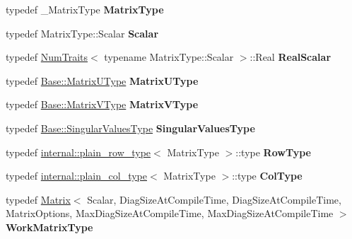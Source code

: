 \begin{DoxyCompactItemize}
typedef \+\_\+\+Matrix\+Type {\bfseries Matrix\+Type}
\item 
\mbox{\label{group___s_v_d___module_af8aa379704163fb6ea722beb615f0862}} 
typedef Matrix\+Type\+::\+Scalar {\bfseries Scalar}
\item 
\mbox{\label{group___s_v_d___module_a33c5cda5ab6ba0d06c567a05deff89e4}} 
typedef \hyperlink{group___core___module_struct_eigen_1_1_num_traits}{Num\+Traits}$<$ typename Matrix\+Type\+::\+Scalar $>$\+::Real {\bfseries Real\+Scalar}
\item 
\mbox{\label{group___s_v_d___module_a8b2e5e357eb839e65cee7f4d56962906}} 
typedef \hyperlink{group___core___module}{Base\+::\+Matrix\+U\+Type} {\bfseries Matrix\+U\+Type}
\item 
\mbox{\label{group___s_v_d___module_a08597d375e3ba00f089e1f3dd994739a}} 
typedef \hyperlink{group___core___module}{Base\+::\+Matrix\+V\+Type} {\bfseries Matrix\+V\+Type}
\item 
\mbox{\label{group___s_v_d___module_aa984693f000ee4bb8b97a8745ce4fc3f}} 
typedef \hyperlink{class_eigen_1_1internal_1_1_tensor_lazy_evaluator_writable}{Base\+::\+Singular\+Values\+Type} {\bfseries Singular\+Values\+Type}
\item 
\mbox{\label{group___s_v_d___module_a207a070b273d496fed8ae023dc65bc1d}} 
typedef \hyperlink{struct_eigen_1_1internal_1_1plain__row__type}{internal\+::plain\+\_\+row\+\_\+type}$<$ Matrix\+Type $>$\+::type {\bfseries Row\+Type}
\item 
\mbox{\label{group___s_v_d___module_aa0f11b5e8b126ff21937e8a08781a50d}} 
typedef \hyperlink{struct_eigen_1_1internal_1_1plain__col__type}{internal\+::plain\+\_\+col\+\_\+type}$<$ Matrix\+Type $>$\+::type {\bfseries Col\+Type}
\item 
\mbox{\label{group___s_v_d___module_a2340597ffb613aec7aeff16310d19639}} 
typedef \hyperlink{group___core___module_class_eigen_1_1_matrix}{Matrix}$<$ Scalar, Diag\+Size\+At\+Compile\+Time, Diag\+Size\+At\+Compile\+Time, Matrix\+Options, Max\+Diag\+Size\+At\+Compile\+Time, Max\+Diag\+Size\+At\+Compile\+Time $>$ {\bfseries Work\+Matrix\+Type}

\end{DoxyCompactItemize}
